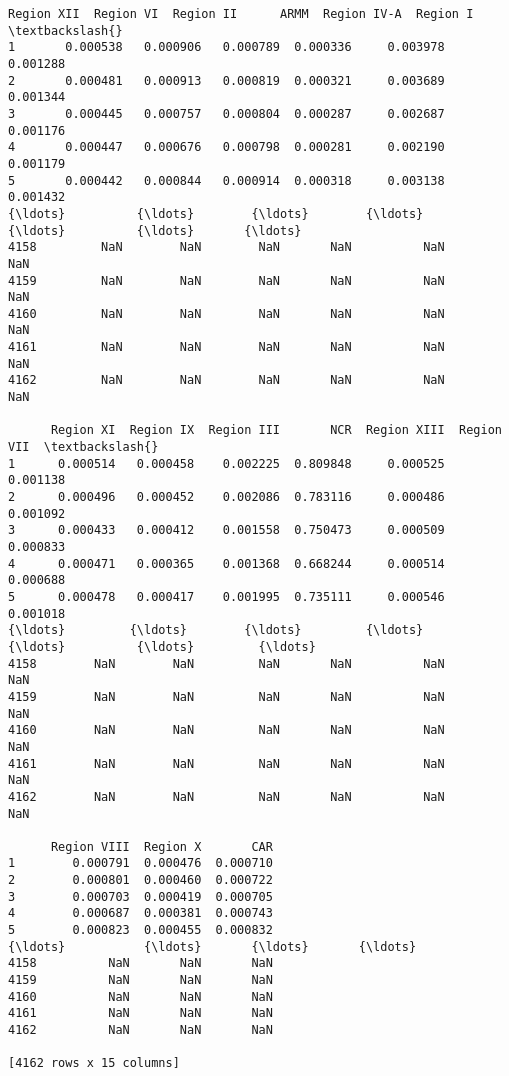 \documentclass[11pt]{article}
\makeatletter
\newcommand{\boxspacing}{\kern\kvtcb@left@rule\kern\kvtcb@boxsep}
\newcommand{\prompt}[4]{
        {\ttfamily\llap{{\color{#2}[#3]:\hspace{3pt}#4}}\vspace{-\baselineskip}}
    }
\makeatother
\begin{document}
            \begin{tcolorbox}[breakable, size=fbox, boxrule=.5pt, pad at break*=1mm, opacityfill=0]
\prompt{Out}{outcolor}{58}{\boxspacing}
\begin{Verbatim}[commandchars=\\\{\}]
      Region XII  Region VI  Region II      ARMM  Region IV-A  Region I  \textbackslash{}
1       0.000538   0.000906   0.000789  0.000336     0.003978  0.001288
2       0.000481   0.000913   0.000819  0.000321     0.003689  0.001344
3       0.000445   0.000757   0.000804  0.000287     0.002687  0.001176
4       0.000447   0.000676   0.000798  0.000281     0.002190  0.001179
5       0.000442   0.000844   0.000914  0.000318     0.003138  0.001432
{\ldots}          {\ldots}        {\ldots}        {\ldots}       {\ldots}          {\ldots}       {\ldots}
4158         NaN        NaN        NaN       NaN          NaN       NaN
4159         NaN        NaN        NaN       NaN          NaN       NaN
4160         NaN        NaN        NaN       NaN          NaN       NaN
4161         NaN        NaN        NaN       NaN          NaN       NaN
4162         NaN        NaN        NaN       NaN          NaN       NaN

      Region XI  Region IX  Region III       NCR  Region XIII  Region VII  \textbackslash{}
1      0.000514   0.000458    0.002225  0.809848     0.000525    0.001138
2      0.000496   0.000452    0.002086  0.783116     0.000486    0.001092
3      0.000433   0.000412    0.001558  0.750473     0.000509    0.000833
4      0.000471   0.000365    0.001368  0.668244     0.000514    0.000688
5      0.000478   0.000417    0.001995  0.735111     0.000546    0.001018
{\ldots}         {\ldots}        {\ldots}         {\ldots}       {\ldots}          {\ldots}         {\ldots}
4158        NaN        NaN         NaN       NaN          NaN         NaN
4159        NaN        NaN         NaN       NaN          NaN         NaN
4160        NaN        NaN         NaN       NaN          NaN         NaN
4161        NaN        NaN         NaN       NaN          NaN         NaN
4162        NaN        NaN         NaN       NaN          NaN         NaN

      Region VIII  Region X       CAR
1        0.000791  0.000476  0.000710
2        0.000801  0.000460  0.000722
3        0.000703  0.000419  0.000705
4        0.000687  0.000381  0.000743
5        0.000823  0.000455  0.000832
{\ldots}           {\ldots}       {\ldots}       {\ldots}
4158          NaN       NaN       NaN
4159          NaN       NaN       NaN
4160          NaN       NaN       NaN
4161          NaN       NaN       NaN
4162          NaN       NaN       NaN

[4162 rows x 15 columns]
\end{Verbatim}
\end{tcolorbox}
        
\end{document}
